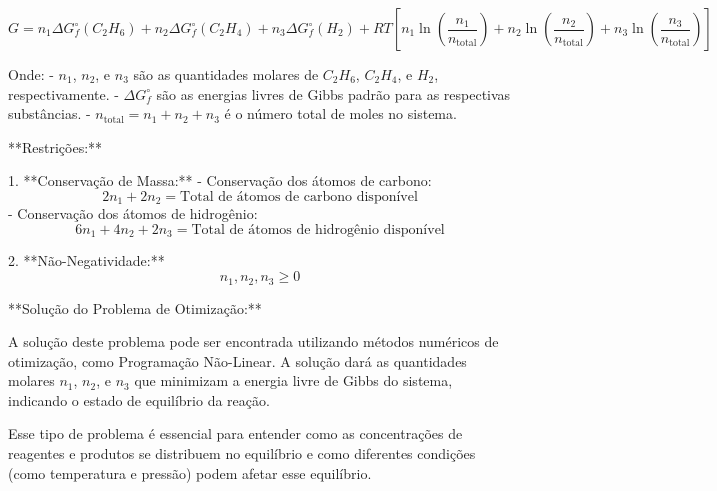 \[
G = n_1 \Delta G_f^\circ(C_2H_6) + n_2 \Delta G_f^\circ(C_2H_4) + n_3 \Delta G_f^\circ(H_2) + RT \left[ n_1 \ln \left(\frac{n_1}{n_{\text{total}}}\right) + n_2 \ln \left(\frac{n_2}{n_{\text{total}}}\right) + n_3 \ln \left(\frac{n_3}{n_{\text{total}}}\right) \right]
\]

Onde:
- \(n_1\), \(n_2\), e \(n_3\) são as quantidades molares de \(C_2H_6\), \(C_2H_4\), e \(H_2\), respectivamente.
- \(\Delta G_f^\circ\) são as energias livres de Gibbs padrão para as respectivas substâncias.
- \(n_{\text{total}} = n_1 + n_2 + n_3\) é o número total de moles no sistema.

**Restrições:**

1. **Conservação de Massa:**
   - Conservação dos átomos de carbono:
     \[
     2n_1 + 2n_2 = \text{Total de átomos de carbono disponível}
     \]
   - Conservação dos átomos de hidrogênio:
     \[
     6n_1 + 4n_2 + 2n_3 = \text{Total de átomos de hidrogênio disponível}
     \]

2. **Não-Negatividade:**
   \[
   n_1, n_2, n_3 \geq 0
   \]

**Solução do Problema de Otimização:**

A solução deste problema pode ser encontrada utilizando métodos numéricos de otimização, como Programação Não-Linear. A solução dará as quantidades molares \(n_1\), \(n_2\), e \(n_3\) que minimizam a energia livre de Gibbs do sistema, indicando o estado de equilíbrio da reação.

Esse tipo de problema é essencial para entender como as concentrações de reagentes e produtos se distribuem no equilíbrio e como diferentes condições (como temperatura e pressão) podem afetar esse equilíbrio.